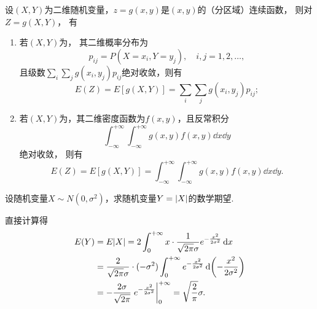 \begin{theorem}\label{theorem:随机变量的数字特征.二维随机变量的函数的数学期望}
设\((X,Y)\)为二维随机变量，\(z=g(x,y)\)是\((x,y)\)的（分区域）连续函数，
则对\(Z=g(X,Y)\)，
有\begin{enumerate}
	\item 若\((X,Y)\)为，
	其二维概率分布为\[
		p_{ij} = P(X=x_i,Y=y_j), \quad i,j=1,2,\dotsc,
	\]
	且级数\(\sum_i \sum_j g(x_i,y_j) p_{ij}\)绝对收敛，则有\[
		E(Z)
		= E[g(X,Y)]
		= \sum_i \sum_j g(x_i,y_j) p_{ij};
	\]
	\item 若\((X,Y)\)为，其二维密度函数为\(f(x,y)\)，且反常积分\[
		\int_{-\infty}^{+\infty} \int_{-\infty}^{+\infty} g(x,y) f(x,y) \dd{x}\dd{y}
	\]绝对收敛，
	则有\[
		E(Z)
		= E[g(X,Y)]
		= \int_{-\infty}^{+\infty} \int_{-\infty}^{+\infty} g(x,y) f(x,y) \dd{x}\dd{y}.
	\]
\end{enumerate}
\end{theorem}

\begin{example}
设随机变量\(X \sim N(0,\sigma^2)\)，求随机变量\(Y = \abs{X}\)的数学期望.
\begin{solution}
直接计算得\begin{align*}
	E(Y) &= E\abs{X}
	= 2 \int_0^{+\infty} x \cdot \frac{1}{\sqrt{2 \pi} \sigma} e^{-\frac{x^2}{2\sigma^2}} \dd{x} \\
	&= \frac2{\sqrt{2 \pi} \sigma} \cdot (-\sigma^2) \int_0^{+\infty} e^{-\frac{x^2}{2\sigma^2}} \dd(-\frac{x^2}{2\sigma^2}) \\
	&= -\frac{2\sigma}{\sqrt{2\pi}} \eval{e^{-\frac{x^2}{2\sigma^2}}}_0^{+\infty}
	= \sqrt{\frac2\pi} \sigma.
\end{align*}
\end{solution}
\end{example}

